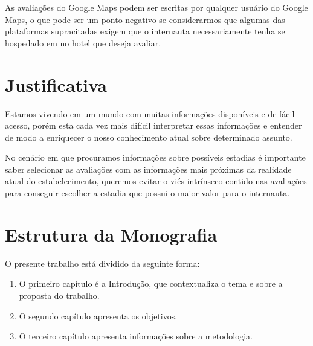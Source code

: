 As avaliações do Google Maps podem ser escritas por qualquer usuário do Google Maps, o que pode ser um ponto negativo se considerarmos que algumas das plataformas supracitadas exigem que o internauta necessariamente tenha se hospedado em no hotel que deseja avaliar.

\begin{comment}
O presente relatório está estruturado da seguinte forma: o capítulo~\ref{cap:justificativa} apresenta… o capítulo~\ref{cap:fund_teorica} ... O capítulo~\ref{cap:metodologia} ..., o capítulo~\ref{cap:resultados} ... O capítulo~\ref{cap:conclusao}

Demonstração de citação: o software de análise foi desenvolvido na linguagem Python~\cite{van1995python}, usando as bibliotecas Pandas~\cite{mckinney2010data} e Scikit-learn~\cite{scikit-learn}.
\end{comment}

\section{Justificativa}

Estamos vivendo em um mundo com muitas informações disponíveis e de fácil acesso, porém esta cada vez mais difícil interpretar essas informações e entender de modo a enriquecer o nosso conhecimento atual sobre determinado assunto.

No cenário em que procuramos informações sobre possíveis estadias é importante saber selecionar as avaliações com as informações mais próximas da realidade atual do estabelecimento, queremos evitar o viés intrínseco contido nas avaliações para conseguir escolher a estadia que possui o maior valor para o internauta.

\section{Estrutura da Monografia}

O presente trabalho está dividido da seguinte forma:
\begin{enumerate}
    \item O primeiro capítulo é a Introdução, que contextualiza o tema e sobre a proposta do trabalho.
    \item O segundo capítulo apresenta os objetivos.
    \item O terceiro capítulo apresenta informações sobre a metodologia.
\end{enumerate}
